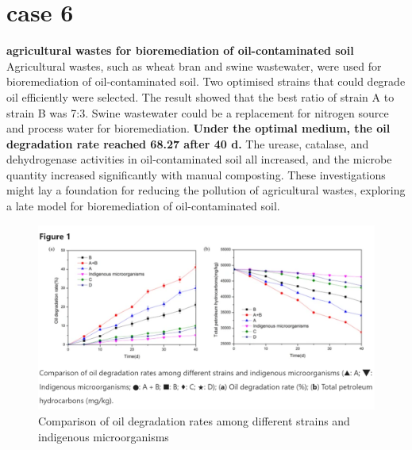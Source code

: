 \documentclass[twocolumn]{article} %
\begin{document}
\section{case 6}
\textbf{agricultural wastes for bioremediation of oil-contaminated soil}\cite{6}\\
Agricultural wastes, such as wheat bran and swine wastewater, were used for bioremediation of oil-contaminated soil. Two optimised strains that could degrade oil efficiently were selected. The result showed that the best ratio of strain A to strain B was 7:3. Swine wastewater could be a replacement for nitrogen source and process water for bioremediation. \textbf{Under the optimal medium, the oil degradation rate reached 68.27 after 40 d.} The urease, catalase, and dehydrogenase activities in oil-contaminated soil all increased, and the microbe quantity increased significantly with manual composting. These investigations might lay a foundation for reducing the pollution of agricultural wastes, exploring a late model for bioremediation of oil-contaminated soil.
\begin{figure}[H]
    \centering
    \includegraphics[width=\columnwidth]{6.png}
    \caption{Comparison of oil degradation rates among different strains and indigenous microorganisms}
\end{figure}
\end{document}
